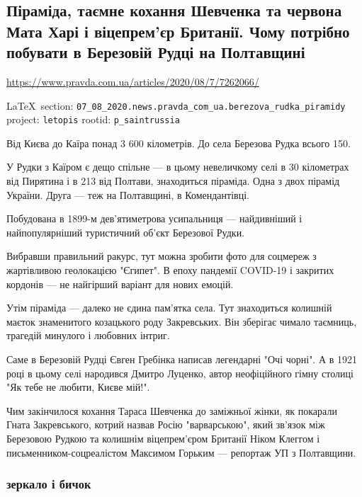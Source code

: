  
 
\subsection{Піраміда, таємне кохання Шевченка та червона Мата Харі і віцепрем'єр Британії. Чому потрібно побувати в Березовій Рудці на Полтавщині}
\url{https://www.pravda.com.ua/articles/2020/08/7/7262066/}
  
\vspace{0.5cm}
 {\ifDEBUG\small\LaTeX~section: \verb|07_08_2020.news.pravda_com_ua.berezova_rudka_piramidy| project: \verb|letopis| rootid: \verb|p_saintrussia| \fi}
\vspace{0.5cm}

Від Києва до Каїра понад 3 600 кілометрів. До села Березова Рудка всього 150.

У Рудки з Каїром є дещо спільне --- в цьому невеличкому селі в 30 кілометрах від
Пирятина і в 213 від Полтави, знаходиться піраміда. Одна з двох пірамід
України. Друга --- теж на Полтавщині, в Комендантівці.

Побудована в 1899-м дев'ятиметрова усипальниця --- найдивніший і найпопулярніший
туристичний об'єкт Березової Рудки.

Вибравши правильний ракурс, тут можна зробити фото для соцмереж з жартівливою
геолокацією "Єгипет". В епоху пандемії COVID-19 і закритих кордонів --- не
найгірший варіант для нових емоцій.

Утім піраміда --- далеко не єдина пам'ятка села. Тут знаходиться колишній маєток
знаменитого козацького роду Закревських. Він зберігає чимало таємниць, трагедій
минулого і любовних інтриг.

Саме в Березовій Рудці Євген Гребінка написав легендарні "Очі чорні". А в 1921
році в цьому селі народився Дмитро Луценко, автор неофіційного гімну столиці
"Як тебе не любити, Києве мій!".

Чим закінчилося кохання Тараса Шевченка до заміжньої жінки, як покарали Гната
Закревського, котрий назвав Росію "варварською", який зв'язок між Березовою
Рудкою та колишнім віцепрем'єром Британії Ніком Клеггом і
письменником-соцреалістом Максимом Горьким --- репортаж УП з Полтавщини.

\subsubsection{зеркало і бичок}

